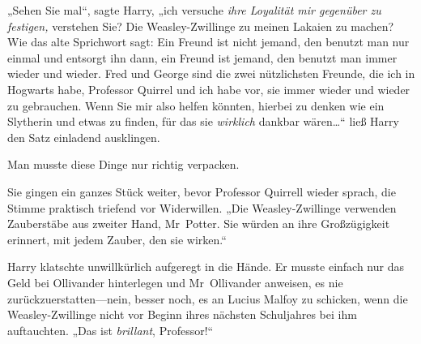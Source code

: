 „Sehen Sie mal“, sagte Harry, „ich versuche \emph{ihre Loyalität mir gegenüber zu festigen,} verstehen Sie? Die Weasley-Zwillinge zu meinen Lakaien zu machen? Wie das alte Sprichwort sagt: Ein Freund ist nicht jemand, den benutzt man nur einmal und entsorgt ihn dann, ein Freund ist jemand, den benutzt man immer wieder und wieder. Fred und George sind die zwei nützlichsten Freunde, die ich in Hogwarts habe, Professor Quirrel und ich habe vor, sie immer wieder und wieder zu gebrauchen. Wenn Sie mir also helfen könnten, hierbei zu denken wie ein Slytherin und etwas zu finden, für das sie \emph{wirklich} dankbar wären…“ ließ Harry den Satz einladend ausklingen.

Man musste diese Dinge nur richtig verpacken.

Sie gingen ein ganzes Stück weiter, bevor Professor Quirrell wieder sprach, die Stimme praktisch triefend vor Widerwillen. „Die Weasley-Zwillinge verwenden Zauberstäbe aus zweiter Hand, Mr~Potter. Sie würden an ihre Großzügigkeit erinnert, mit jedem Zauber, den sie wirken.“

Harry klatschte unwillkürlich aufgeregt in die Hände. Er musste einfach nur das Geld bei Ollivander hinterlegen und Mr~Ollivander anweisen, es nie zurückzuerstatten—nein, besser noch, es an Lucius Malfoy zu schicken, wenn die Weasley-Zwillinge nicht vor Beginn ihres nächsten Schuljahres bei ihm auftauchten. „Das ist \emph{brillant}, Professor!“

